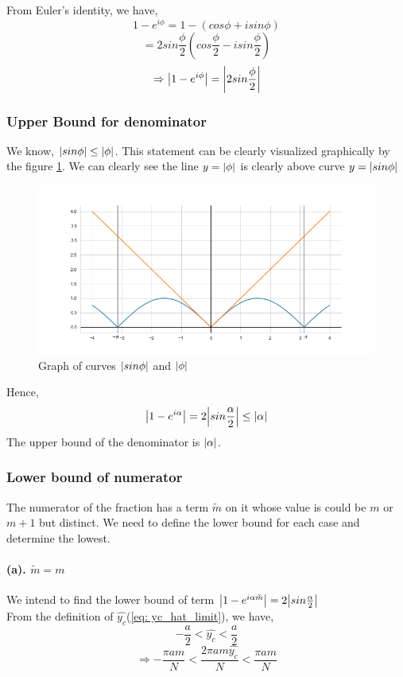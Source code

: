 From Euler's identity, we have,
$$1-e^{i\phi} = 1-(cos\phi + i sin\phi)$$
$$= 2 sin\frac{\phi}{2}(cos\frac{\phi}{2} -i sin\frac{\phi}{2})$$
$$\Rightarrow \abs{1-e^{i\phi}}= \abs{2 sin\frac{\phi}{2}}$$

\subsubsection{Upper Bound for denominator}
We know, $\abs{sin \phi} \leq \abs{\phi}$. This statement can be clearly visualized graphically by the figure \ref{fig: sinx_less_than_x}. We can clearly see the line $y=\abs{\phi}$ is clearly above curve $y= \abs{sin \phi} $
\begin{figure}[H]
    \centering
    \includegraphics[scale=0.4]{figures/sinx_less_than_x.png}
    \caption{Graph of curves $\abs{sin \phi}$ and $\abs{\phi}$}
    \label{fig: sinx_less_than_x}
\end{figure}
Hence, $$\abs{1-e^{i\alpha}}= 2\abs{sin\frac{\alpha}{2}} \leq \abs{\alpha}$$
The upper bound of the denominator is $\abs{\alpha}$.

\subsubsection{Lower bound of numerator}
The numerator of the fraction has a term $\tilde{m}$ on it whose value is could be $m$ or $m+1$ but distinct. We need to define the lower bound for each case and determine the lowest.

\paragraph{(a). $\tilde{m}=m$\\}
We intend to find the lower bound of term $\abs{1-e^{i\alpha \tilde{m}}} = 2\abs{sin\frac{\alpha}{2}} $
\\ From the definition of $\hat{y_c}$(\ref{eq: yc_hat_limit}), we have,
$$-\frac{a}{2} < \hat{y_c} < \frac{a}{2}$$
$$\Rightarrow -\frac{\pi a m}{N} < \frac{2\pi a m\hat{y_c}}{N} < \frac{\pi a m}{N} $$
        
